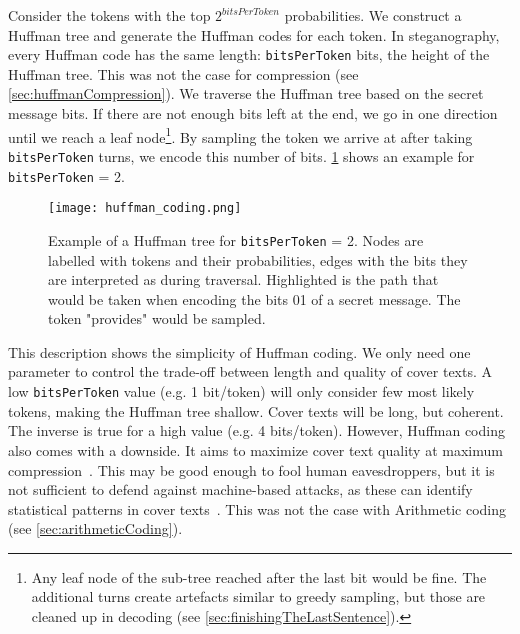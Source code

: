 Consider the tokens with the top $ 2^{bitsPerToken} $ probabilities. We construct a Huffman tree and generate the Huffman codes for each token. In steganography, every Huffman code has the same length: \lstinline|bitsPerToken| bits, the height of the Huffman tree. This was not the case for compression (see \cref{sec:huffmanCompression}). We traverse the Huffman tree based on the secret message bits. If there are not enough bits left at the end, we go in one direction until we reach a leaf node\footnote{Any leaf node of the sub-tree reached after the last bit would be fine. The additional turns create artefacts similar to greedy sampling, but those are cleaned up in decoding (see \cref{sec:finishingTheLastSentence}).}. By sampling the token we arrive at after taking \lstinline|bitsPerToken| turns, we encode this number of bits. \cref{fig:huffmanCoding} shows an example for \lstinline|bitsPerToken| = 2.

\begin{figure}
    \begin{wide}
        \captionsetup{width=\linewidth}
        \texttt{[image: huffman\_coding.png]}
		\caption[Huffman coding]{Example of a Huffman tree for \lstinline|bitsPerToken| = 2. Nodes are labelled with tokens and their probabilities, edges with the bits they are interpreted as during traversal. Highlighted is the path that would be taken when encoding the bits 01 of a secret message. The token "provides" would be sampled.}
        \label{fig:huffmanCoding}
    \end{wide}
\end{figure}

This description shows the simplicity of Huffman coding. We only need one parameter to control the trade-off between length and quality of cover texts. A low \lstinline|bitsPerToken| value (e.g. 1 bit/token) will only consider few most likely tokens, making the Huffman tree shallow. Cover texts will be long, but coherent. The inverse is true for a high value (e.g. 4 bits/token). However, Huffman coding also comes with a downside. It aims to maximize cover text quality at maximum compression~\cite{zieglerNeuralLinguisticSteganography2019}. This may be good enough to fool human eavesdroppers, but it is not sufficient to defend against machine-based attacks, as these can identify statistical patterns in cover texts~\cite{zieglerNeuralLinguisticSteganography2019}. This was not the case with Arithmetic coding (see \cref{sec:arithmeticCoding}).

